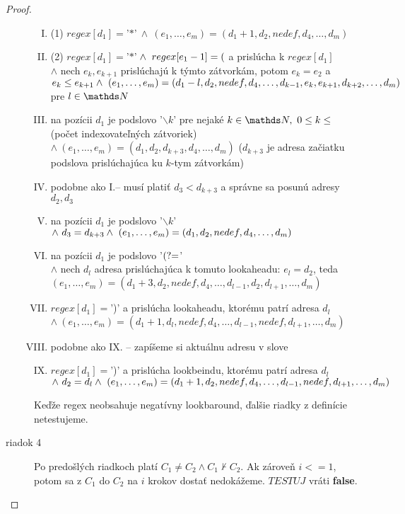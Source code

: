 \begin{proof}
\begin{description}
\begin{enumerate}[I.]
\item (1) $regex[d_1]=$'$*$'$~\wedge~(e_1,\dots,e_m)=(d_1+1,d_2,nedef,d_4,\dots,d_m)$
\setcounter{enumi}{4}
\item (2) $regex[d_1]=$'$*$'$ \\ \wedge~regex[e_1-1]=($ a prislúcha k $regex[d_1]$ \\ $\wedge$ nech $e_k,e_{k+1}$ prislúchajú k týmto zátvorkám, potom $e_k=e_2$ a $e_k\leq e_{k+1} \\ \wedge ~(e_1,\dots,e_m)=(d_1-l,d_2,nedef,d_4,\dots,d_{k-1},e_k,e_{k+1},d_{k+2},\dots, d_m)$ pre $l\in\N$
\item na pozícii $d_1$ je podslovo '$\backslash k$' pre nejaké $k\in\N, ~0\leq k \leq$ (počet indexovateľných zátvoriek) \\ $\wedge ~ (e_1,\dots,e_m)= (d_1,d_2,d_{k+3},d_4,\dots,d_m)$ ($d_{k+3}$ je adresa začiatku podslova prislúchajúca ku $k$-tym zátvorkám)
\item podobne ako I.-- musí platiť $d_3<d_{k+3}$ a správne sa posunú adresy $d_2,d_3$
\item na pozícii $d_1$ je podslovo '$\backslash k$' \\ $\wedge ~ d_3=d_{k+3} \\ \wedge ~(e_1,\dots, e_m)=(d_1,d_2,nedef,d_4,\dots,d_m)$
\item na pozícii $d_1$ je podslovo '$\text{(?=}$' \\ $\wedge$ nech $d_l$ adresa prislúchajúca k tomuto lookaheadu: $e_l=d_2$, teda $(e_1,\dots,e_m)=(d_1+3,d_2,nedef,d_4,\dots,d_{l-1},d_2,d_{l+1},\dots,d_m)$
\item $regex[d_1]=$')' a prislúcha lookaheadu, ktorému patrí adresa $d_l$ \\ $\wedge ~(e_1,\dots,e_m)=(d_1+1,d_l,nedef,d_4,\dots,d_{l-1},nedef,d_{l+1},\dots,d_m)$
\item podobne ako IX. -- zapíšeme si aktuálnu adresu v slove
\item $regex[d_1]=$')' a prislúcha lookbeindu, ktorému patrí adresa $d_l$ \\ $\wedge ~ d_2=d_l \\ \wedge ~(e_1,\dots,e_m)=(d_1+1,d_2,nedef,d_4,\dots,d_{l-1},nedef,d_{l+1},\dots,d_m)$
\end{enumerate}
Keďže regex neobsahuje negatívny lookbaround, ďalšie riadky z definície netestujeme.
\item[riadok 4] Po predošlých riadkoch platí $C_1\neq C_2 \wedge C_1 \nvdash C_2$. Ak zároveň $i<=1$, potom sa z $C_1$ do $C_2$ na $i$ krokov dostať nedokážeme. $TESTUJ$ vráti \textbf{false}.

\end{description}
\end{proof}
